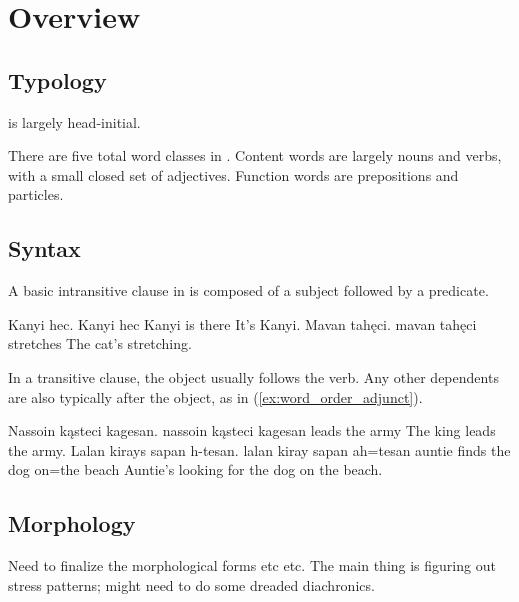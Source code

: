 \chapter{Overview}
\section{Typology}
\langname{} is largely head-initial.

There are five total word classes in \langname{}. Content words are largely nouns and verbs, with a small closed set of adjectives. Function words are prepositions and particles.

\section{Syntax}
A basic intransitive clause in \langname{} is composed of a subject followed by a predicate.  

\begin{examples}
    \ex
        \script Kanyi hec.
        \bits Kanyi hec
        \gloss Kanyi {is there}
        \tr It's Kanyi.
    \ex
        \script Mavan tahęci.
        \bits mavan tahęci
         stretches
        \tr The cat's stretching.
\end{examples}

In a transitive clause, the object usually follows the verb. Any other dependents are also typically after the object, as in (\ref{ex:word_order_adjunct}).

\begin{examples}
    \ex
        \script Nassoin kąsteci kagesan.
        \bits nassoin kąsteci kagesan
         leads {the army}
        \tr The king leads the army.
    \ex \label{ex:word_order_adjunct}
        \script Lalan kirays sapan h-tesan.
        \bits lalan kiray sapan ah=tesan
        \gloss auntie finds {the dog} on={the beach}
        \tr Auntie's looking for the dog on the beach.
\end{examples}

\section{Morphology}

\begin{kaobox}[frametitle=\sc todo:]
    Need to finalize the morphological forms etc etc. The main thing is figuring out stress patterns; might need to do some dreaded diachronics.
\end{kaobox}

